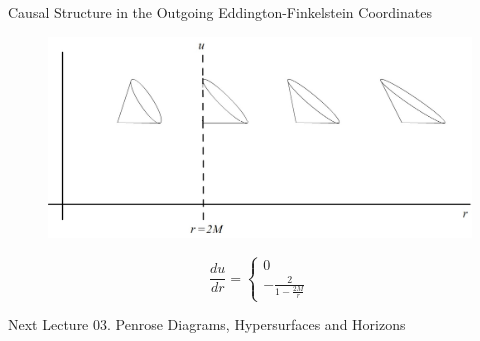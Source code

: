 \documentclass{beamer}
\begin{document}
        \begin{frame}{Causal Structure in the Outgoing Eddington-Finkelstein Coordinates}
        	\begin{center}
				\begin{figure}
				\includegraphics[scale=0.75] {fig3.jpg}
				\end{figure}
                \tiny{
                $$ \frac{du}{dr} = \left\lbrace 
            		\begin{array}{c} 0\\
						-\frac{2}{1 - \frac{2M}{r}}
					\end{array} \right. $$}
			\end{center}
        \end{frame}
        
  \begin{darkframes} 
  		\begin{frame}{Next Lecture}
        	\Large
			{03. Penrose Diagrams, Hypersurfaces and Horizons}
		\end{frame}
  
  
  \end{darkframes}
\end{document}
